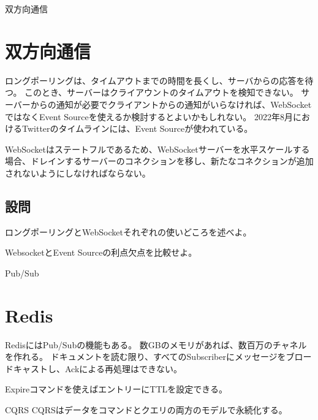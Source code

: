 \documentclass[book]{jlreq}
\begin{document}
\begin{chapter-bib}{双方向通信}
  \section{双方向通信}
  ロングポーリングは、タイムアウトまでの時間を長くし、サーバからの応答を待つ。
  このとき、サーバーはクライアウントのタイムアウトを検知できない\cite{sdi}。
  サーバーからの通知が必要でクライアントからの通知がいらなければ、WebSocketではなくEvent Sourceを使えるか検討するとよいかもしれない。
  2022年8月におけるTwitterのタイムラインには、Event Sourceが使われている。

  WebSocketはステートフルであるため、WebSocketサーバーを水平スケールする場合、ドレインするサーバーのコネクションを移し、新たなコネクションが追加されないようにしなければならない\cite{sdi2}。
  \subsection{設問}
  \begin{exercise}
  \item ロングポーリングとWebSocketそれぞれの使いどころを述べよ。
  \item WebsocketとEvent Sourceの利点欠点を比較せよ。
  \end{exercise}
\end{chapter-bib}
\begin{chapter-bib}{Pub/Sub}
  \section{Redis}
  RedisにはPub/Subの機能もある\cite{redis-pubsub}。
  数GBのメモリがあれば、数百万のチャネルを作れる\cite{sdi2}。
  ドキュメントを読む限り、すべてのSubscriberにメッセージをブロードキャストし、Ackによる再処理はできない。

  Expireコマンドを使えばエントリーにTTLを設定できる\cite{redis-expire}。

\end{chapter-bib}
\begin{chapter-bib}{CQRS}
  CQRSはデータをコマンドとクエリの両方のモデルで永続化する\cite{microsoft-cqrs}。
\end{chapter-bib}
\end{document}
